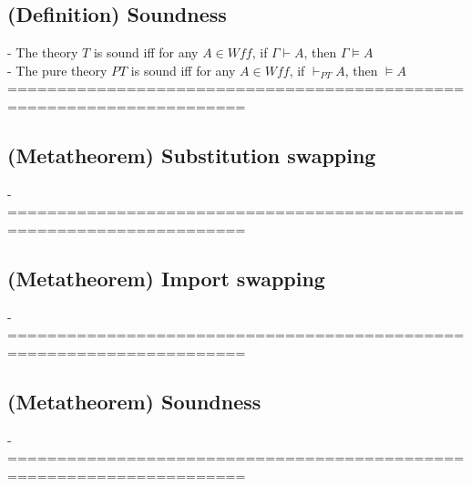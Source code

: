 \documentclass{article}
\begin{document}
\subsection{(Definition) Soundness}
	- The theory $T$ is sound iff for any $A \in Wff$, if $\Gamma \vdash A$, then $\Gamma \vDash A$ \\
	- The pure theory $PT$ is sound iff for any $A \in Wff$, if $\vdash_{PT} A$, then $\vDash A$ \\
	======================================================================
\subsection{(Metatheorem) Substitution swapping}
	- 
	======================================================================
\subsection{(Metatheorem) Import swapping}
	- 
	======================================================================
\subsection{(Metatheorem) Soundness}
	- 
	======================================================================

\begin{comment}
\subsection{() }
	- 
	======================================================================

Hotkeys:
Ctrl+R
Ctrl+K, Ctrl+1
Ctrl+K, Ctrl+J
Ctrl+Shift+[
Ctrl+Shift+[

TODO:
- TODO REREAD STUFF AFTER DEFINITIONS ARE DONE, SKIPPED A LOT
- fix hypothesis referencing - WITH Hypothesis (SOMETHING)
- fix \vdash \vDash writing metaproofs - consistency
- use cantor product + sequences instead kleene star 
- closed terms are important in semantics ?? review dis
\end{comment}
\end{document}
